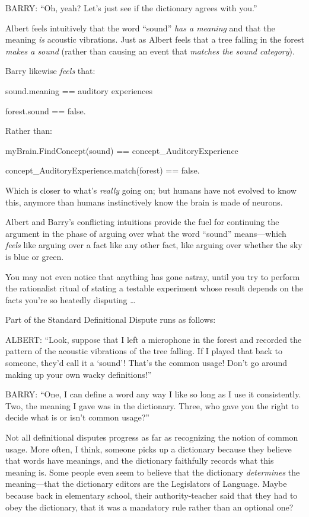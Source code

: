 {
 BARRY: ``Oh, yeah? Let's just see
if the dictionary agrees with you.''}

{
 Albert feels intuitively that the word
``sound'' \textit{has a meaning} and
that the meaning \textit{is} acoustic vibrations. Just as Albert feels
that a tree falling in the forest \textit{makes a sound} (rather than
causing an event that \textit{matches the sound category}).}

{
 Barry likewise \textit{feels} that:}

{
 sound.meaning == auditory experiences}

{
 forest.sound == false.}

{
 Rather than:}

{
 myBrain.FindConcept({\textquotedbl}sound{\textquotedbl}) ==
concept\_AuditoryExperience}

{
 concept\_AuditoryExperience.match(forest) == false.}

{
 Which is closer to what's \textit{really} going
on; but humans have not evolved to know this, anymore than humans
instinctively know the brain is made of neurons.}

{
 Albert and Barry's conflicting intuitions provide
the fuel for continuing the argument in the phase of arguing over what
the word ``sound'' means---which
\textit{feels} like arguing over a fact like any other fact, like
arguing over whether the sky is blue or green.}

{
 You may not even notice that anything has gone astray, until you
try to perform the rationalist ritual of stating a testable experiment
whose result depends on the facts you're so heatedly
disputing \ldots}

\myendsectiontext


{
 Part of the Standard Definitional Dispute runs as follows:}

{
 ALBERT: ``Look, suppose that I left a microphone
in the forest and recorded the pattern of the acoustic vibrations of
the tree falling. If I played that back to someone,
they'd call it a
`sound'! That's the
common usage! Don't go around making up your own wacky
definitions!''}

{
 BARRY: ``One, I can define a word any way I like
so long as I use it consistently. Two, the meaning I gave was in the
dictionary. Three, who gave you the right to decide what is or
isn't common usage?''}

{
 Not all definitional disputes progress as far as recognizing the
notion of common usage. More often, I think, someone picks up a
dictionary because they believe that words have meanings, and the
dictionary faithfully records what this meaning is. Some people even
seem to believe that the dictionary \textit{determines} the
meaning---that the dictionary editors are the Legislators of Language.
Maybe because back in elementary school, their authority-teacher said
that they had to obey the dictionary, that it was a mandatory rule
rather than an optional one?}

